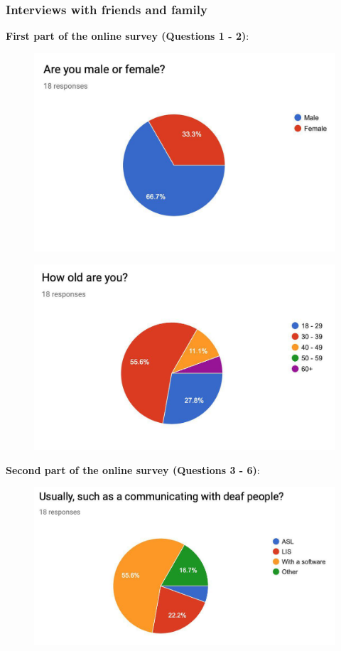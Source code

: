 \subsubsection{Interviews with friends and family}
\textbf{First part of the online survey (Questions 1 - 2)}:

\begin{figure}[h]
	\centering
	\includegraphics[width=0.7\linewidth]{Figure/photo_2019-02-06_15-58-48}
	\label{fig:photo2019-02-0615-58-48}
\end{figure}
\begin{figure}[h]
	\centering
	\includegraphics[width=0.7\linewidth]{Figure/photo_2019-02-06_15-58-49}
	\label{fig:photo2019-02-0615-58-49}
\end{figure}
\clearpage
\textbf{Second part of the online survey (Questions 3 - 6)}:
\begin{figure}[h]
	\centering
	\includegraphics[width=0.7\linewidth]{Figure/photo_2019-02-06_15-58-50}
	\label{fig:photo2019-02-0615-58-50}
\end{figure}
